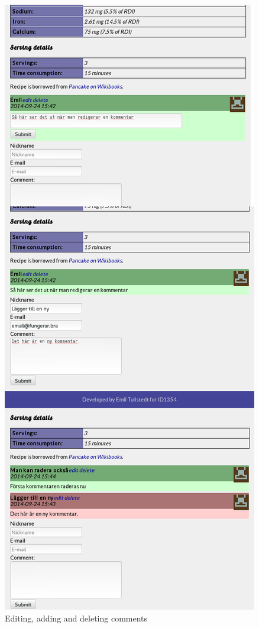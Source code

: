 \documentclass[a4paper]{scrartcl}
\begin{document}
\begin{figure}[!h]
  \begin{center}
    \includegraphics[scale=0.3]{kommentar_all.png}
    \caption{Editing, adding and deleting comments}
    \label{fig:comments}
  \end{center}
\end{figure}
\end{document}
